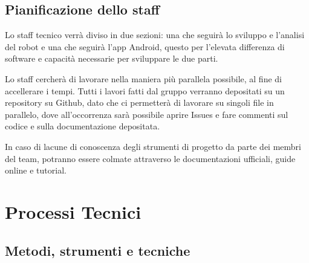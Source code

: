 \documentclass{article}
\begin{document}
  \subsection{Pianificazione dello
  staff}
  
  Lo staff tecnico verrà diviso in due sezioni: una che seguirà lo
  sviluppo e l'analisi del robot e una che seguirà l'app Android, questo
  per l'elevata differenza di software e capacità necessarie per
  sviluppare le due parti.
  
  Lo staff cercherà di lavorare nella maniera più parallela possibile, al fine di accellerare i tempi. Tutti i lavori fatti dal gruppo verranno depositati su un repository su Github, dato che ci permetterà di lavorare su singoli file in parallelo, dove all'occorrenza sarà possibile aprire Issues e fare commenti sul codice e sulla documentazione depositata.
  
  In caso di lacune di conoscenza degli strumenti di progetto da parte dei membri del team, potranno essere colmate attraverso le documentazioni ufficiali, guide online e tutorial.
  
  \section{Processi Tecnici}
  
  \subsection{Metodi, strumenti e
  tecniche}
  
\end{document}

